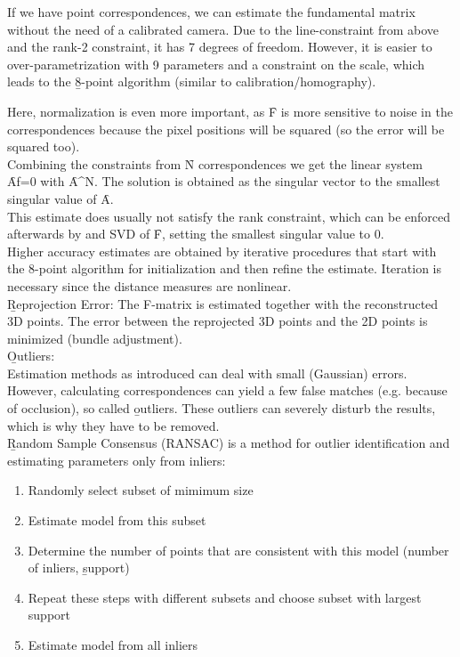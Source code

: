 If we have point correspondences, we can estimate the fundamental matrix without the need of a calibrated camera. Due to the line-constraint from above and the rank-2 constraint, it has 7 degrees of freedom. However, it is easier to over-parametrization with 9 parameters and a constraint on the scale, which leads to the \b{8-point algorithm} (similar to calibration/homography).
\newpage

Here, normalization is even more important, as \f{F} is more sensitive to noise in the correspondences because the pixel positions will be squared (so the error will be squared too).\\
Combining the constraints from \f{N} correspondences we get the linear system \f{Af=0} with \f{A\in{}^{N}}. The solution is obtained as the singular vector to the smallest singular value of \f{A}.\\ This estimate does usually not satisfy the rank constraint, which can be enforced afterwards by and SVD of \f{F}, setting the smallest singular value to 0.\\

Higher accuracy estimates are obtained by iterative procedures that start with the 8-point algorithm for initialization and then refine the estimate. Iteration is necessary since the distance measures are nonlinear.\\

\b{Reprojection Error:} The F-matrix is estimated together with the reconstructed 3D points. The error between the reprojected 3D points and the 2D points is minimized (bundle adjustment).\\

\b{Outliers:\\[0.5em]}
Estimation methods as introduced can deal with small (Gaussian) errors. However, calculating correspondences can yield a few false matches (e.g. because of occlusion), so called \b{outliers}. These outliers can severely disturb the results, which is why they have to be removed.\\

\b{Random Sample Consensus (RANSAC)} is a method for outlier identification and estimating parameters only from inliers:
\begin{enumerate}
    \item Randomly select subset of mimimum size
    \item Estimate model from this subset
    \item Determine the number of points that are consistent with this model (number of inliers, \b{support})
    \item Repeat these steps with different subsets and choose subset with largest support
    \item Estimate model from all inliers
\end{enumerate}

